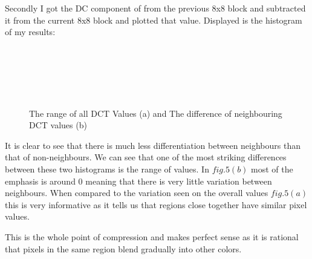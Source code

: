 \documentclass[]{assignment}
\begin{document}
Secondly I got the DC component of from the previous 8x8 block and subtracted it from the current 8x8 block and plotted that value. Displayed is the histogram of my results:

\begin{figure}[h]
\centering
\fboxsep 0mm
\parbox{7cm}{\\}
~~~
\parbox{7cm}{\\}
\caption{\label{fig:imgfilter1} The range of all DCT Values (a) and The difference of neighbouring DCT values (b)}
\end{figure} 

It is clear to see that there is much less differentiation between neighbours than that of non-neighbours. We can see that one of the most striking differences between these two histograms is the range of values. In $fig.5(b)$ most of the emphasis is around 0 meaning that there is very little variation between neighbours. When compared to the variation seen on the overall values $fig.5(a)$ this is very informative as it tells us that regions close together have similar pixel values. 

This is the whole point of compression and makes perfect sense as it is rational that pixels in the same region blend gradually into other colors. 


\label{last_page}

 
\end{document}
